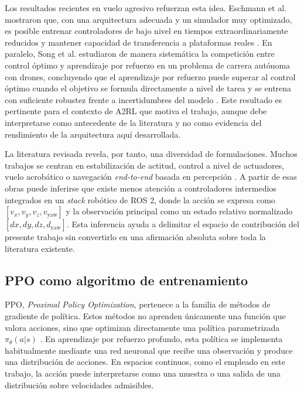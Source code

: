 Los resultados recientes en vuelo agresivo refuerzan esta idea. Eschmann et al.
mostraron que, con una arquitectura adecuada y un simulador muy optimizado, es
posible entrenar controladores de bajo nivel en tiempos extraordinariamente
reducidos y mantener capacidad de transferencia a plataformas reales
\cite{eschmann2024seconds}. En paralelo, Song et al. estudiaron de manera
sistemática la competición entre control óptimo y aprendizaje por refuerzo en un
problema de carrera autónoma con drones, concluyendo que el aprendizaje por
refuerzo puede superar al control óptimo cuando el objetivo se formula directamente
a nivel de tarea y se entrena con suficiente robustez frente a incertidumbres del
modelo \cite{song2023racing}. Este resultado es pertinente para el contexto de A2RL
que motiva el trabajo, aunque debe interpretarse como antecedente de la literatura y
no como evidencia del rendimiento de la arquitectura aquí desarrollada.

La literatura revisada revela, por tanto, una diversidad de formulaciones. Muchos
trabajos se centran en estabilización de actitud, control a nivel de actuadores, vuelo
acrobático o navegación \emph{end-to-end} basada en percepción
\cite{kaufmann2020acrobatics, pi2021lowlevel, yoo2021hybrid}. A partir de esas obras
puede inferirse que existe menos atención a controladores intermedios integrados en
un \emph{stack} robótico de ROS 2, donde la acción se expresa como
$[v_x, v_y, v_z, v_{\mathrm{yaw}}]$ y la observación principal como un estado relativo
normalizado $[dx, dy, dz, d_{\mathrm{yaw}}]$. Esta inferencia ayuda a delimitar el
espacio de contribución del presente trabajo sin convertirlo en una afirmación
absoluta sobre toda la literatura existente.

\subsection{PPO como algoritmo de entrenamiento}

PPO, \emph{Proximal Policy Optimization}, pertenece a la familia de métodos de
gradiente de política. Estos métodos no aprenden únicamente una función que valora
acciones, sino que optimizan directamente una política parametrizada
$\pi_\theta(a|s)$ \cite{schulman2017ppo}. En aprendizaje por refuerzo profundo, esta
política se implementa habitualmente mediante una red neuronal que recibe una
observación y produce una distribución de acciones. En espacios continuos, como el
empleado en este trabajo, la acción puede interpretarse como una muestra o una
salida de una distribución sobre velocidades admisibles.

